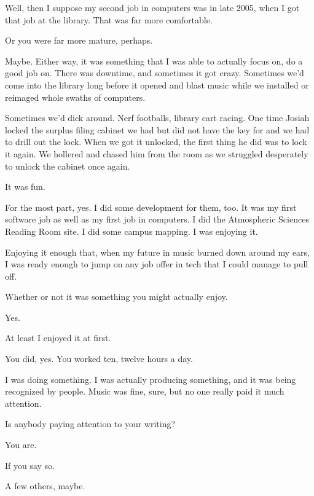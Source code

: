 Well, then I suppose my second job in computers was in late 2005, when I got that job at the library. That was far more comfortable.

\begin{ally}
Or you were far more mature, perhaps.
\end{ally}
Maybe. Either way, it was something that I was able to actually focus on, do a good job on. There was downtime, and sometimes it got crazy. Sometimes we'd come into the library long before it opened and blast music while we installed or reimaged whole swaths of computers.

Sometimes we'd dick around. Nerf footballs, library cart racing. One time Josiah locked the surplus filing cabinet we had but did not have the key for and we had to drill out the lock. When we got it unlocked, the first thing he did was to lock it again. We hollered and chased him from the room as we struggled desperately to unlock the cabinet once again.

\begin{ally}
It was fun.
\end{ally}
For the most part, yes. I did some development for them, too. It was my first software job as well as my first job in computers. I did the Atmospheric Sciences Reading Room site. I did some campus mapping. I was enjoying it.

Enjoying it enough that, when my future in music burned down around my ears, I was ready enough to jump on any job offer in tech that I could manage to pull off.

\begin{ally}
Whether or not it was something you might actually enjoy.
\end{ally}
Yes.
\newpage

At least I enjoyed it at first.

\begin{ally}
You did, yes. You worked ten, twelve hours a day.
\end{ally}
I was doing something. I was actually producing something, and it was being recognized by people. Music was fine, sure, but no one really paid it much attention.

\begin{ally}
Is anybody paying attention to your writing?
\end{ally}
You are.

\begin{ally}
If you say so.
\end{ally}
A few others, maybe.

